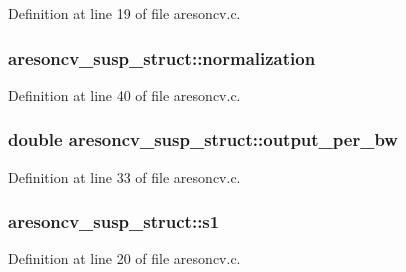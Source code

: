 Definition at line 19 of file aresoncv.\+c.

\subsubsection[{\texorpdfstring{normalization}{normalization}}]{ aresoncv\+\_\+susp\+\_\+struct\+::normalization}\hypertarget{structaresoncv__susp__struct_a3e361b18c427aa0c3c16360cc5f629be}{}\label{structaresoncv__susp__struct_a3e361b18c427aa0c3c16360cc5f629be}


Definition at line 40 of file aresoncv.\+c.

\subsubsection[{\texorpdfstring{output\+\_\+per\+\_\+bw}{output_per_bw}}]{\setlength{\rightskip}{0pt plus 5cm}double aresoncv\+\_\+susp\+\_\+struct\+::output\+\_\+per\+\_\+bw}\hypertarget{structaresoncv__susp__struct_a3a033046459c77cd41fc130423e1e1e6}{}\label{structaresoncv__susp__struct_a3a033046459c77cd41fc130423e1e1e6}


Definition at line 33 of file aresoncv.\+c.

\subsubsection[{\texorpdfstring{s1}{s1}}]{ aresoncv\+\_\+susp\+\_\+struct\+::s1}\hypertarget{structaresoncv__susp__struct_a62ac78b3e23f367d6df4df7765b1908a}{}\label{structaresoncv__susp__struct_a62ac78b3e23f367d6df4df7765b1908a}


Definition at line 20 of file aresoncv.\+c.

